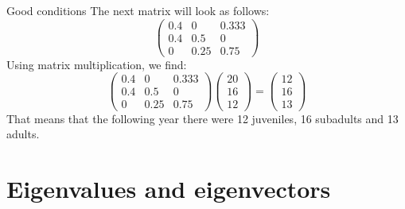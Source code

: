 \documentclass[a4paper]{report}
\begin{document}
\begin{Answer}[ref=alba]
\Question Good conditions
\subQuestion The next matrix will look as follows:
\begin{equation*}
\begin{pmatrix}
0.4&0&0.333\\0.4&0.5&0\\0&0.25&0.75
\end{pmatrix}
\end{equation*}
\subQuestion Using matrix multiplication, we find:
\begin{equation*}
\begin{pmatrix}
0.4&0&0.333\\0.4&0.5&0\\0&0.25&0.75
\end{pmatrix}
\begin{pmatrix}
20\\16\\12
\end{pmatrix}=\begin{pmatrix}
12\\16\\13
\end{pmatrix}
\end{equation*}
That means that the following year there were 12 juveniles, 16 subadults and 13 adults. 

\end{Answer}
\section{Eigenvalues and eigenvectors}
\end{document}
